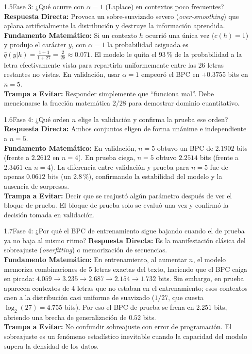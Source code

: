 \documentclass[11pt,letterpaper]{article}
\begin{document}
\begin{qbox}{1.5}{Fase 3: ¿Qué ocurre con $\alpha = 1$ (Laplace) en contextos poco frecuentes?}
\textbf{Respuesta Directa:} Provoca un sobre-suavizado severo (\textit{over-smoothing}) que aplana artificialmente la distribución y destruye la información aprendida.\\[3pt]
\textbf{Fundamento Matemático:} Si un contexto $h$ ocurrió una única vez ($c(h)=1$) y produjo el carácter $y$, con $\alpha=1$ la probabilidad asignada es $\hat{q}(y|h) = \frac{1+1}{1+27} = \frac{2}{28} \approx 0.071$. El modelo le quita el 93\,\% de la probabilidad a la letra efectivamente vista para repartirla uniformemente entre las 26 letras restantes no vistas. En validación, usar $\alpha=1$ empeoró el BPC en $+0.3755$ bits en $n=5$.\\[3pt]
\textbf{Trampa a Evitar:} Responder simplemente que ``funciona mal''. Debe mencionarse la fracción matemática $2/28$ para demostrar dominio cuantitativo.
\end{qbox}

\begin{qbox}{1.6}{Fase 4: ¿Qué orden $n$ elige la validación y confirma la prueba ese orden?}
\textbf{Respuesta Directa:} Ambos conjuntos eligen de forma unánime e independiente a $n=5$.\\[3pt]
\textbf{Fundamento Matemático:} En validación, $n=5$ obtuvo un BPC de $2.1902$ bits (frente a $2.2612$ en $n=4$). En prueba ciega, $n=5$ obtuvo $2.2514$ bits (frente a $2.3461$ en $n=4$). La diferencia entre validación y prueba para $n=5$ fue de apenas $0.0612$ bits (un 2.8\,\%), confirmando la estabilidad del modelo y la ausencia de sorpresas.\\[3pt]
\textbf{Trampa a Evitar:} Decir que se reajustó algún parámetro después de ver el bloque de prueba. El bloque de prueba solo se evaluó una vez y confirmó la decisión tomada en validación.
\end{qbox}

\begin{qbox}{1.7}{Fase 4: ¿Por qué el BPC de entrenamiento sigue bajando cuando el de prueba ya no baja al mismo ritmo?}
\textbf{Respuesta Directa:} Es la manifestación clásica del sobreajuste (\textit{overfitting}) o memorización de secuencias.\\[3pt]
\textbf{Fundamento Matemático:} En entrenamiento, al aumentar $n$, el modelo memoriza combinaciones de 5 letras exactas del texto, haciendo que el BPC caiga en picada: $4.059 \to 3.235 \to 2.687 \to 2.154 \to 1.732$ bits. Sin embargo, en prueba aparecen contextos de 4 letras que no estaban en el entrenamiento; esos contextos caen a la distribución casi uniforme de suavizado ($1/27$, que cuesta $\log_2(27) = 4.755$ bits). Por eso el BPC de prueba se frena en $2.251$ bits, abriendo una brecha de generalización de $0.52$ bits.\\[3pt]
\textbf{Trampa a Evitar:} No confundir sobreajuste con error de programación. El sobreajuste es un fenómeno estadístico inevitable cuando la capacidad del modelo supera la densidad de los datos.
\end{qbox}
\end{document}
